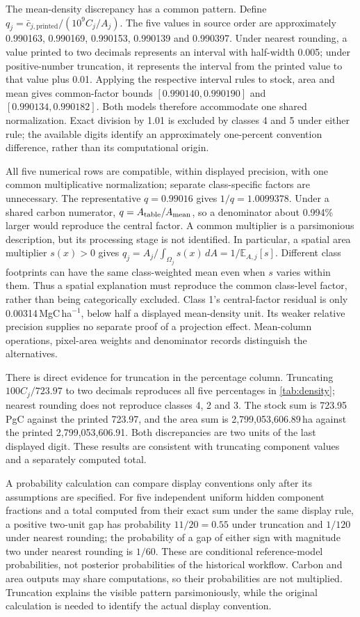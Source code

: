 \documentclass[11pt,a4paper]{article}
\newcommand{\E}{\mathbb{E}}
\theoremstyle{remark}
\begin{document}
The mean-density discrepancy has a common pattern. Define $q_j=\bar c_{j,\mathrm{printed}}/(10^9C_j/A_j)$. The five values in source order are approximately 0.990163, 0.990169, 0.990153, 0.990139 and 0.990397. Under nearest rounding, a value printed to two decimals represents an interval with half-width 0.005; under positive-number truncation, it represents the interval from the printed value to that value plus 0.01. Applying the respective interval rules to stock, area and mean gives common-factor bounds $[0.990140,0.990190]$ and $[0.990134,0.990182]$. Both models therefore accommodate one shared normalization. Exact division by 1.01 is excluded by classes 4 and 5 under either rule; the available digits identify an approximately one-percent convention difference, rather than its computational origin.

All five numerical rows are compatible, within displayed precision, with one common multiplicative normalization; separate class-specific factors are unnecessary. The representative $q=0.99016$ gives $1/q=1.0099378$. Under a shared carbon numerator, $q=A_{\rm table}/A_{\rm mean}$, so a denominator about 0.994\% larger would reproduce the central factor. A common multiplier is a parsimonious description, but its processing stage is not identified. In particular, a spatial area multiplier $s(x)>0$ gives $q_j=A_j/\int_{\Omega_j}s(x)\,dA=1/\E_{A,j}[s]$. Different class footprints can have the same class-weighted mean even when $s$ varies within them. Thus a spatial explanation must reproduce the common class-level factor, rather than being categorically excluded. Class 1's central-factor residual is only 0.00314\,MgC\,ha$^{-1}$, below half a displayed mean-density unit. Its weaker relative precision supplies no separate proof of a projection effect. Mean-column operations, pixel-area weights and denominator records distinguish the alternatives.

There is direct evidence for truncation in the percentage column. Truncating $100C_j/723.97$ to two decimals reproduces all five percentages in \cref{tab:density}; nearest rounding does not reproduce classes 4, 2 and 3. The stock sum is 723.95\,PgC against the printed 723.97, and the area sum is 2,799,053,606.89\,ha against the printed 2,799,053,606.91. Both discrepancies are two units of the last displayed digit. These results are consistent with truncating component values and a separately computed total.

A probability calculation can compare display conventions only after its assumptions are specified. For five independent uniform hidden component fractions and a total computed from their exact sum under the same display rule, a positive two-unit gap has probability $11/20=0.55$ under truncation and $1/120$ under nearest rounding; the probability of a gap of either sign with magnitude two under nearest rounding is $1/60$. These are conditional reference-model probabilities, not posterior probabilities of the historical workflow. Carbon and area outputs may share computations, so their probabilities are not multiplied. Truncation explains the visible pattern parsimoniously, while the original calculation is needed to identify the actual display convention.
\end{document}
